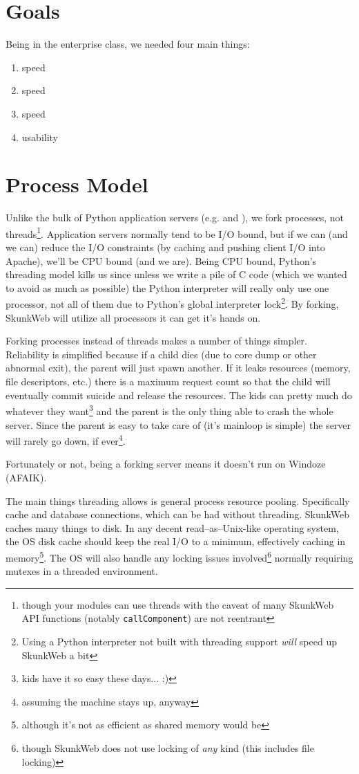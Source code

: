 \documentclass[twocolumn]{article}
\begin{document}
\section{Goals}
Being in the enterprise class, we needed four main things:
\begin{enumerate}
\item speed
\item speed
\item speed
\item usability
\end{enumerate}

\section{Process Model}
Unlike the bulk of Python application servers (e.g. \cite{zope} and
\cite{pywx}), we fork processes, not threads\footnote{though your
modules can use threads with the caveat of many SkunkWeb API
functions (notably \texttt{callComponent}) are not reentrant}.
Application servers normally tend to be I/O bound, but if we can (and
we can) reduce the I/O constraints (by caching and pushing client I/O
into Apache), we'll be CPU bound (and we are).  Being CPU bound,
Python's threading model kills us since unless we write a pile of C
code (which we wanted to avoid as much as possible) the Python
interpreter will really only use one processor, not all of them due to
Python's global interpreter lock\footnote{Using a Python interpreter
not built with threading support \emph{will} speed up SkunkWeb
a bit}.  By forking, SkunkWeb will utilize all processors it can get
it's hands on.

Forking processes instead of threads makes a number of things simpler.
Reliability is simplified because if a child dies (due to core dump or
other abnormal exit), the parent will just spawn another.  If it leaks
resources (memory, file descriptors, etc.) there is a maximum request
count so that the child will eventually commit suicide and release the
resources.  The kids can pretty much do whatever they
want\footnote{kids have it so easy these days... :)} and the parent is
the only thing able to crash the whole server.  Since the parent is
easy to take care of (it's mainloop is simple) the server will rarely
go down, if ever\footnote{assuming the machine stays up, anyway}.

Fortunately or not, being a forking server means it doesn't run on
Windoze (AFAIK).  

The main things threading allows is general process resource pooling.
Specifically cache and database connections, which can be had without
threading.  SkunkWeb caches many things to disk. In any decent
read--as--Unix-like operating system, the OS disk cache should keep
the real I/O to a minimum, effectively caching in
memory\footnote{although it's not as efficient as shared memory would
be}.  The OS will also handle any locking issues
involved\footnote{though SkunkWeb does not use locking of \emph{any}
kind (this includes file locking)} normally requiring mutexes in a
threaded environment.
\end{document}
